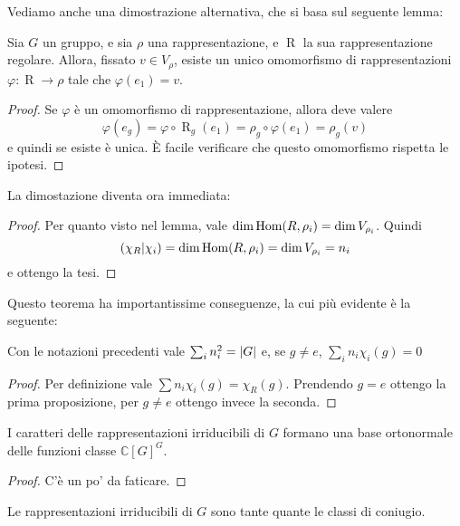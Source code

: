 \documentclass[a4paper,10pt,oneside]{math_article}
\renewcommand{\phi}{\varphi}
\newcommand{\herm}[2]{\left(#1 | #2\right)}
\newcommand{\class}[1]{\mathbb C[#1]^#1}
\DeclareMathOperator{\Reg}{R}
\begin{document}
    Vediamo anche una dimostrazione alternativa, che si basa sul seguente lemma:
    \begin{mylemma}
      Sia $G$ un gruppo, e sia $\rho$ una rappresentazione, e $\Reg$ la sua rappresentazione regolare. Allora, fissato $v\in V_\rho$, esiste un unico omomorfismo di rappresentazioni $\phi: \Reg \rightarrow \rho$ tale che $\phi(e_1)=v$.
    \end{mylemma}
    \begin{proof}
      Se $\phi$ è un omomorfismo di rappresentazione, allora deve valere 
      \[
      \phi(e_g)=\phi \circ \Reg_g (e_1) = \rho_g \circ \phi (e_1) = \rho_g(v)
      \]
      e quindi se esiste è unica. \`E facile verificare che questo omomorfismo rispetta le ipotesi.
    \end{proof}
    
    La dimostazione diventa ora immediata:
    \begin{proof}
     Per quanto visto nel lemma, vale $\dim \operatorname{Hom}(R,\rho_i) = \dim V_{\rho_i}$. Quindi
     \[
      \herm{\chi_R}{\chi_i}= \dim \Hom(R,\rho_i) = \dim V_{\rho_i} = n_i
     \]
     e ottengo la tesi.
    \end{proof}
    
    Questo teorema ha importantissime conseguenze, la cui più evidente è la seguente:
    \begin{myprop}
     Con le notazioni precedenti vale $\sum_i n_i^2 = \left|G\right|$ e, se $g\ne e$, $\sum_i n_i \chi_i(g)=0$
    \end{myprop}
    \begin{proof}
     Per definizione vale $\sum n_i \chi_i(g) = \chi_R(g)$. Prendendo $g=e$ ottengo la prima proposizione, per $g\ne e$ ottengo invece la seconda.
    \end{proof}

    \begin{mytheorem}
     I caratteri delle rappresentazioni irriducibili di $G$ formano una base ortonormale delle funzioni classe $\class G$.
    \end{mytheorem}
    
    \begin{proof}
     C'è un po' da faticare.
    \end{proof}

    
    \begin{mytheorem}
     Le rappresentazioni irriducibili di $G$ sono tante quante le classi di coniugio.
    \end{mytheorem}
\end{document}
